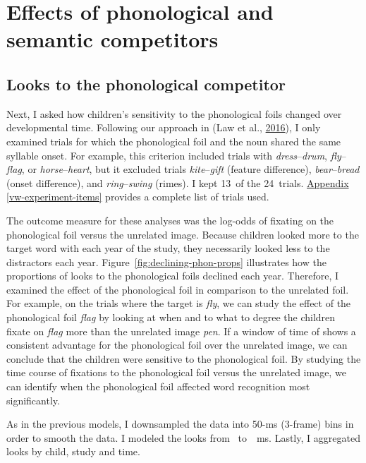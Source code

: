 \documentclass [11pt, proquest] {uwthesis}[2015/03/03]
\begin{document}
\chapter{Effects of phonological and semantic
competitors}\label{effects-of-phonological-and-semantic-competitors}

\section{Looks to the phonological
competitor}\label{looks-to-the-phonological-competitor}

Next, I asked how children's sensitivity to the phonological foils
changed over developmental time. Following our approach in (Law et al.,
\protect\hyperlink{ref-RWLPaper}{2016}), I only examined trials for
which the phonological foil and the noun shared the same syllable onset.
For example, this criterion included trials with
\emph{dress}--\emph{drum}, \emph{fly}--\emph{flag}, or
\emph{horse}--\emph{heart}, but it excluded trials
\emph{kite}--\emph{gift} (feature difference), \emph{bear}--\emph{bread}
(onset difference), and \emph{ring}--\emph{swing} (rimes). I kept 13~of
the 24~trials. \protect\hyperlink{vw-experiment-items}{Appendix
\ref{vw-experiment-items}} provides a complete list of trials used.

The outcome measure for these analyses was the log-odds of fixating on
the phonological foil versus the unrelated image. Because children
looked more to the target word with each year of the study, they
necessarily looked less to the distractors each year.
Figure~\ref{fig:declining-phon-props} illustrates how the proportions of
looks to the phonological foils declined each year. Therefore, I
examined the effect of the phonological foil in comparison to the
unrelated foil. For example, on the trials where the target is
\emph{fly}, we can study the effect of the phonological foil \emph{flag}
by looking at when and to what to degree the children fixate on
\emph{flag} more than the unrelated image \emph{pen}. If a window of
time of shows a consistent advantage for the phonological foil over the
unrelated image, we can conclude that the children were sensitive to the
phonological foil. By studying the time course of fixations to the
phonological foil versus the unrelated image, we can identify when the
phonological foil affected word recognition most significantly.

As in the previous models, I downsampled the data into 50-ms (3-frame)
bins in order to smooth the data. I modeled the looks from~ to~~ms.
Lastly, I aggregated looks by child, study and time.
\end{document}
